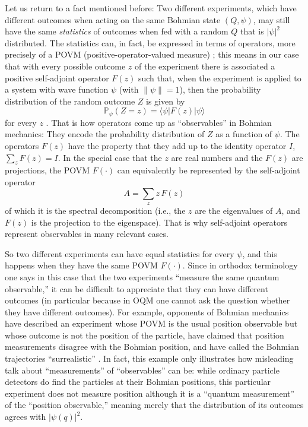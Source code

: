 \documentclass[12pt]{article}
\newcommand{\be}{\begin{equation}}
\newcommand{\ee}{\end{equation}}
\newcommand{\PPP}{\mathbb{P}}
\newcommand{\scp}[2]{\langle #1|#2 \rangle}
\begin{document}
Let us return to a fact mentioned before: Two different experiments, which have different outcomes when acting on the same Bohmian state $(Q,\psi)$, may still have the same \emph{statistics} of outcomes when fed with a random $Q$ that is $|\psi|^2$ distributed. The statistics can, in fact, be expressed in terms of operators, more precisely of a POVM (positive-operator-valued measure) \cite{POVM}; this means in our case that with every possible outcome $z$ of the experiment there is associated a positive self-adjoint operator $F(z)$ such that, when the experiment is applied to a system with wave function $\psi$ (with $\|\psi\|=1$), then the probability distribution of the random outcome $Z$ is given by
\be
\PPP_{\psi}(Z=z) = \scp{\psi}{F(z)|\psi}
\ee
for every $z$ \cite{DGZ04}. That is how operators come up as ``observables'' in Bohmian mechanics: They encode the probability distribution of $Z$ as a function of $\psi$. The operators $F(z)$ have the property that they add up to the identity operator $I$, $\sum_z F(z) = I$. In the special case that the $z$ are real numbers and the $F(z)$ are projections, the POVM $F(\cdot)$ can equivalently be represented by the self-adjoint operator
\be
A=\sum_z z\, F(z)
\ee
of which it is the spectral decomposition (i.e., the $z$ are the eigenvalues of $A$, and $F(z)$ is the projection to the eigenspace). That is why self-adjoint operators represent observables in many relevant cases.

So two different experiments can have equal statistics for every $\psi$, and this happens when they have the same POVM $F(\cdot)$. Since in orthodox terminology one says in this case that the two experiments ``measure the same quantum observable,'' it can be difficult to appreciate that they can have different outcomes (in particular because in OQM one cannot ask the question whether they have different outcomes). For example, opponents of Bohmian mechanics have described an experiment whose POVM is the usual position observable but whose outcome is not the position of the particle, have claimed that position measurements disagree with the Bohmian position, and have called the Bohmian trajectories ``surrealistic'' \cite{surr1,surr2}. In fact, this example only illustrates how misleading talk about ``measurements'' of ``observables'' can be: while ordinary particle detectors do find the particles at their Bohmian positions, this particular experiment does not measure position although it is a ``quantum measurement'' of the ``position observable,'' meaning merely that the distribution of its outcomes agrees with $|\psi(q)|^2$.
\end{document}
